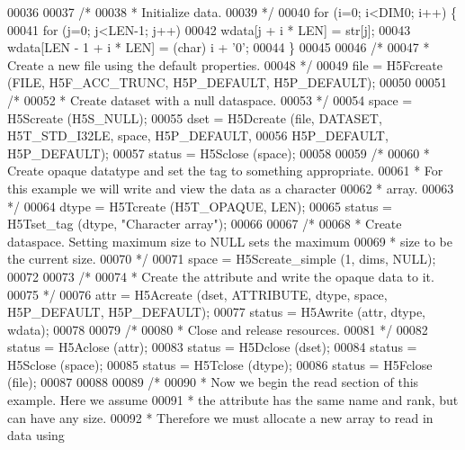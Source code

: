 \begin{DoxyCode}
00036 
00037     \textcolor{comment}{/*}
00038 \textcolor{comment}{     * Initialize data.}
00039 \textcolor{comment}{     */}
00040     \textcolor{keywordflow}{for} (i=0; i<DIM0; i++) \{
00041         \textcolor{keywordflow}{for} (j=0; j<LEN-1; j++)
00042             wdata[j + i * LEN] = str[j];
00043         wdata[LEN - 1 + i * LEN] = (char) i + \textcolor{charliteral}{'0'};
00044     \}
00045 
00046     \textcolor{comment}{/*}
00047 \textcolor{comment}{     * Create a new file using the default properties.}
00048 \textcolor{comment}{     */}
00049     file = H5Fcreate (FILE, H5F\_ACC\_TRUNC, H5P\_DEFAULT, H5P\_DEFAULT);
00050 
00051     \textcolor{comment}{/*}
00052 \textcolor{comment}{     * Create dataset with a null dataspace.}
00053 \textcolor{comment}{     */}
00054     space = H5Screate (H5S\_NULL);
00055     dset = H5Dcreate (file, DATASET, H5T\_STD\_I32LE, space, H5P\_DEFAULT,
00056                 H5P\_DEFAULT, H5P\_DEFAULT);
00057     status = H5Sclose (space);
00058 
00059     \textcolor{comment}{/*}
00060 \textcolor{comment}{     * Create opaque datatype and set the tag to something appropriate.}
00061 \textcolor{comment}{     * For this example we will write and view the data as a character}
00062 \textcolor{comment}{     * array.}
00063 \textcolor{comment}{     */}
00064     dtype = H5Tcreate (H5T\_OPAQUE, LEN);
00065     status = H5Tset\_tag (dtype, \textcolor{stringliteral}{"Character array"});
00066 
00067     \textcolor{comment}{/*}
00068 \textcolor{comment}{     * Create dataspace.  Setting maximum size to NULL sets the maximum}
00069 \textcolor{comment}{     * size to be the current size.}
00070 \textcolor{comment}{     */}
00071     space = H5Screate\_simple (1, dims, NULL);
00072 
00073     \textcolor{comment}{/*}
00074 \textcolor{comment}{     * Create the attribute and write the opaque data to it.}
00075 \textcolor{comment}{     */}
00076     attr = H5Acreate (dset, ATTRIBUTE, dtype, space, H5P\_DEFAULT, H5P\_DEFAULT);
00077     status = H5Awrite (attr, dtype, wdata);
00078 
00079     \textcolor{comment}{/*}
00080 \textcolor{comment}{     * Close and release resources.}
00081 \textcolor{comment}{     */}
00082     status = H5Aclose (attr);
00083     status = H5Dclose (dset);
00084     status = H5Sclose (space);
00085     status = H5Tclose (dtype);
00086     status = H5Fclose (file);
00087 
00088 
00089     \textcolor{comment}{/*}
00090 \textcolor{comment}{     * Now we begin the read section of this example.  Here we assume}
00091 \textcolor{comment}{     * the attribute has the same name and rank, but can have any size.}
00092 \textcolor{comment}{     * Therefore we must allocate a new array to read in data using}

\end{DoxyCode}

